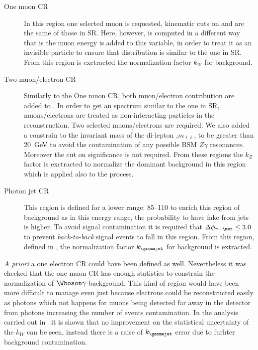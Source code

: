 \begin{description}
\item [One muon CR] In this region one selected muon is requested, kinematic cuts on \pt and \met are the same of those in SR. Here, however, \met is computed in a different way that is the muon energy is added to this variable, in order to treat it as an invisible particle to ensure that \met distribution is similar to the one in SR. From this region is exctracted the normalization factor $k_W$ for \wg background.
\item [Two muon/electron CR] Similarly to the One muon CR, both muon/electron contribution are added to \met. In order to get an \met spectrum similar to the one in SR, muons/electrons are treated as non-interacting particles in the \met reconstruction. Two selected muons/electrons are required. We also added a constrain to the invariant mass of the di-lepton ,$m_{\ell\ell}$, to be greater than \SI{20}{\GeV} to avoid the contamination of any possible BSM $Z\gamma$ resonances. Moreover the cut on \met significance is not required. From these regions the $k_Z$ factor is exctracted to normalize the dominant background \zg in this region which is applied also to the \znng process.
\item [Photon jet CR] This region is defined for a lower \met range: \SIrange{85}{110}{\gev} to enrich this region of \gj background as in this energy range, the probability to have fake \met from jets is higher. To avoid signal contamination it is required that $\Delta\phi_{\gamma - \met} \le 3.0$ to prevent {\itshape back-to-back} signal events to fall in this region. From this region, defined in \RunTwo, the normalization factor $k_\gammajet$ for \gj background is extracted.
\end{description}

{\itshape A priori} a one electron CR could have been defined as well. Nevertheless it was checked that the one muon CR has enough statistics to constrain the normalization of $\Wboson\gamma$ background.  This kind of region would have been more difficult to manage even just because electrons could be reconstructed easily as photons which not happens for muons being detected far away in the detector from photons increasing the number of \gj events contamination. In the \mph analysis carried out in~\cite{paperMP} it is shown that no improvement on the statistical uncertainty of the $k_W$ can be seen, instead there is a raise of $k_{\gammajet}$ error due to furhter background contamination.


